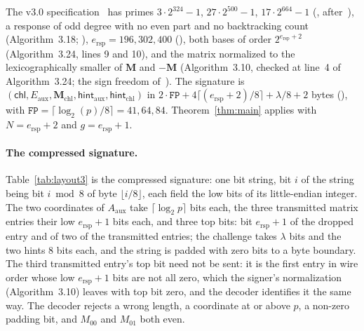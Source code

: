 \documentclass[version=submission]{iacrcc}
\newcommand{\ers}{e_{\mathrm{rsp}}}
\newcommand{\Mm}{\mathbf{M}}
\newcommand{\Eaux}{E_{\mathrm{aux}}}
\begin{document}
The v3.0 specification~\cite{sqisign-spec-r3} has primes $3 \cdot
2^{324} - 1$, $27 \cdot 2^{500} - 1$, $17 \cdot 2^{664} - 1$
(\cite[Section~5.2]{sqisign-spec-r3}, after~\cite{wes26}), a response of odd degree with no even
part and no backtracking count (Algorithm~3.18; \cite[Section~9.5]{sqisign-spec-r3}), $\ers =
196, 302, 400$ (\cite[Table~5]{sqisign-spec-r3}), both bases of order $2^{\ers + 2}$
(Algorithm~3.24, lines 9 and 10), and the matrix normalized to the
lexicographically smaller of $\Mm$ and $-\Mm$ (Algorithm~3.10, checked at
line~4 of Algorithm~3.24; the sign freedom of~\cite{aux-freedom}). The
signature is $(\mathsf{chl}, \Eaux, \Mm_{\mathrm{chl}},
\mathsf{hint}_{\mathrm{aux}}, \mathsf{hint}_{\mathrm{chl}})$ in $2 \cdot
\texttt{FP} + 4 \lceil (\ers + 2)/8 \rceil + \lambda / 8 + 2$ bytes
(\cite[Chapter~6, Table~11]{sqisign-spec-r3}), with $\texttt{FP} = \lceil \log_2 (p) / 8 \rceil =
41, 64, 84$. Theorem~\ref{thm:main} applies with $N = \ers + 2$ and $g =
\ers + 1$.

\paragraph{The compressed signature.}
Table~\ref{tab:layout3} is the compressed signature: one bit string, bit $i$ of the string being bit $i \bmod 8$ of byte $\lfloor i / 8 \rfloor$, each field the low bits of its little-endian integer.
The two coordinates of $A_{\mathrm{aux}}$ take $\lceil \log_2 p \rceil$ bits each,
the three transmitted matrix entries their low $\ers + 1$ bits each, and three top bits: bit $\ers + 1$ of the dropped entry and of two of the transmitted entries; the challenge takes $\lambda$ bits and the two hints 8 bits each, and the string is padded with zero bits to a byte boundary.
The third transmitted entry's top bit need not be sent: it is the first entry in wire order whose low $\ers + 1$ bits are not all zero, which the signer's normalization (Algorithm~3.10) leaves with top bit zero, and the decoder identifies it the same way.
The decoder rejects a wrong length, a coordinate at or above $p$, a non-zero padding bit, and
$M_{00}$ and $M_{01}$ both even.
\end{document}
